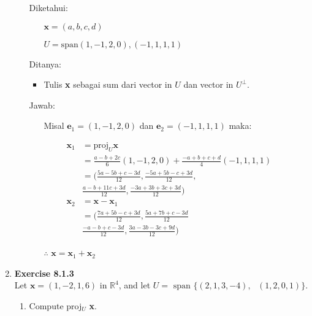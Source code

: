 \documentclass[12pt, a4paper]{scrartcl}
\begin{document}
\begin{enumerate}
\begin{enumerate}
                Diketahui:
                \begin{itemize}
                    \item[] $\textbf{x}=(a,b,c,d)$
                    \item[] $U=\mbox{span}{(1,-1,2,0),(-1,1,1,1)}$
                \end{itemize}

                Ditanya:
                \begin{itemize}
                    \item Tulis \textbf{x} sebagai sum dari vector in $U$ dan vector in $U^\perp$.
                \end{itemize}
            
                Jawab:
                \begin{itemize}
                    \item[] Misal $\textbf{e}_1 = (1,-1,2,0)$ dan $\textbf{e}_2 = (-1,1,1,1)$ maka:
                \end{itemize}
                \begin{align*}
                    \textbf{x}_1 &= \mbox{proj}_U \textbf{x}
                    \\ &= \frac{a-b+2c}{6}(1,-1,2,0)+\frac{-a+b+c+d}{4}(-1,1,1,1)
                    \\ &= (\frac{5a-5b+c-3d}{12}, \frac{-5a+5b-c+3d}{12},
                    \\ &\frac{a-b+11c+3d}{12}, \frac{-3a+3b+3c+3d}{12})
                    \\ \textbf{x}_2 &= \textbf{x} - \textbf{x}_1
                    \\ &= (\frac{7a+5b-c+3d}{12}, \frac{5a+7b+c-3d}{12}
                    \\ &\frac{-a-b+c-3d}{12}, \frac{3a-3b-3c+9d}{12})
                \end{align*}

                \begin{itemize}
                    \item[$\therefore$] $\textbf{x}=\textbf{x}_1 + \textbf{x}_2$
                \end{itemize}
            \end{enumerate}

            \pagebreak
            
            \item \textbf{Exercise 8.1.3}\\Let $\textbf{x}=(1, -2, 1, 6)$ in $\mathbb{R}^4$, and let $U = \mbox{ span } \{(2, 1, 3, -4), \mbox{ }(1, 2, 0, 1)\}$.
            \begin{enumerate}
                \item Compute proj$_U$ \textbf{x}.
                

\end{enumerate}
\end{enumerate}
\end{document}
